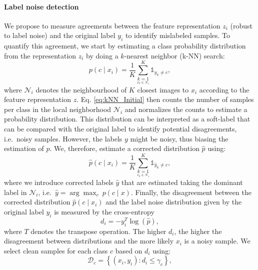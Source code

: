 \documentclass[final]{cvpr}
\begin{document}
\paragraph*{Label noise detection }

We propose to measure agreements between the feature representation $z_{i}$ (robust to label noise) and the original label $y_{i}$ to identify mislabeled samples. To quantify this agreement, we start by estimating a class probability distribution from the representation $z_{i}$ by doing a $k$-nearest neighbor (k-NN) search:
\begin{equation}
p\left(c\mid x_{i}\right)=\frac{1}{K}\sum_{\underset{x_{k}\in\mathcal{N}_{i}}{k=1}}^{K}\mathds{1}_{y_{k}\neq c},\label{eq:kNN_Initial}
\end{equation}
where $\mathcal{N}_{i}$ denotes the neighbourhood of $K$ closest images to $x_{i}$ according to the feature representation $z$. Eq. \ref{eq:kNN_Initial} then counts the number of samples per class in the local neighborhood $\mathcal{N}_{i}$ and normalizes the counts to estimate a probability distribution. This distribution can be interpreted as a soft-label that can be compared with the original label to identify potential disagreements, i.e.~noisy samples. However, the labels $y$ might be noisy, thus biasing the estimation of $p$. We, therefore, estimate a corrected distribution $\hat{p}$ using:
\begin{equation} 
\hat{p}\left(c\mid x_{i}\right)=\frac{1}{K}\sum_{\underset{x_{k}\in\mathcal{N}_{i}}{k=1}}^{K}\mathds{1}_{\hat{y}_{k}\neq c},\label{eq:kNN_final}
\end{equation}
where we introduce corrected labels $\hat{y}$ that are estimated taking the dominant label in $\mathcal{N}_{i}$, i.e.~$\hat{y}=\arg\max_{c}\:p\left(c\mid x\right)$. Finally, the disagreement between the corrected distribution $\hat{p}\left(c\mid x_{i}\right)$ and the label noise distribution given by the original label $y_{i}$ is measured by the cross-entropy
\begin{equation}
d_{i}=-y_{i}^{T}\log\left(\hat{p}\right),
\end{equation}
where $T$ denotes the transpose operation. The higher $d_{i}$, the higher the disagreement between distributions and the more likely $x_{i}$ is a noisy sample. We select clean samples for each class $c$ based on $d_{i}$ using: 
\begin{equation}
\mathcal{D}_{c}=\left\{ \left(x_{i},y_{i}\right):d_{i}\leq\gamma_{c}\right\} ,
\end{equation}
\end{document}
